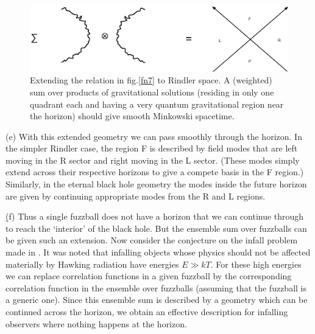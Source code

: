 \documentclass[11pt]{article}
\begin{document}
\begin{figure}[htbp]
\begin{center}
\includegraphics[scale=.85]{fn12.eps}
\caption{{Extending the relation in fig.\ref{fn7} to Rindler space. A (weighted) sum over products of gravitational solutions (residing in only one quadrant each and having a very quantum gravitational region  near the horizon) should give smooth Minkowski spacetime.}}
\label{fn12}
\end{center}
\end{figure}


(e) With this extended geometry we can pass smoothly through the horizon. In the simpler Rindler case, the region F is described by field modes that are left moving in the R sector and right moving in the L sector. (These modes simply extend across their respective horizons to give a compete basis in the F region.) Similarly, in the eternal black hole geometry the modes inside the future horizon are given by continuing appropriate modes from the R and L regions. 

\b

(f) Thus a single fuzzball does not have a horizon that we can continue through to reach the `interior' of the black hole. But the ensemble sum over fuzzballs can be given such an extension. Now consider the conjecture on the infall problem made in \cite{mathurrecent}. It was noted that infalling objects whose physics should not be affected materially by Hawking radiation have energies $E\gg kT$. For these high energies we can replace correlation functions in a given fuzzball by the corresponding  correlation function in the ensemble over fuzzballs (assuming that the fuzzball is a generic one). Since this ensemble sum is described by a geometry which can be continued across the horizon, we obtain an effective description for infalling observers where nothing happens at the horizon.
\end{document}

